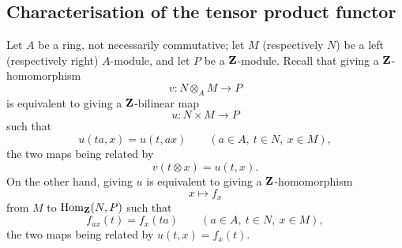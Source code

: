 \subsection{Characterisation of the tensor product functor}
\label{subsection:III.7.2}

\begin{env}[7.2.1]
\label{III.7.2.1}
Let $A$ be a ring, not necessarily commutative; let $M$
(respectively $N$) be a left (respectively right) $A$-module,
and let $P$ be a $\mathbf{Z}$-module.  Recall that giving a
$\mathbf{Z}$-homomorphism
\[
  v:N\otimes_A M\longrightarrow P
\]
is equivalent to giving a $\mathbf{Z}$-bilinear map
\[
  u:N\times M\longrightarrow P
\]
such that
\[
  u(ta,x)=u(t,ax)
  \qquad(a\in A,\ t\in N,\ x\in M),
\]
the two maps being related by
\[
  v(t\otimes x)=u(t,x).
\]
On the other hand, giving $u$ is equivalent to giving a
$\mathbf{Z}$-homomorphism
\[
  x\longmapsto f_x
\]
from $M$ to $\operatorname{Hom}_{\mathbf{Z}}(N,P)$ such that
\[
  f_{ax}(t)=f_x(ta)
  \qquad(a\in A,\ t\in N,\ x\in M),
\]
the two maps being related by $u(t,x)=f_x(t)$.
\end{env}

